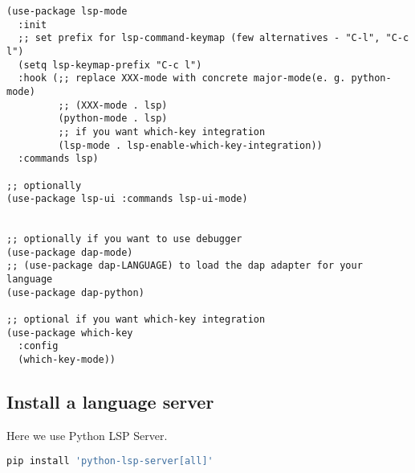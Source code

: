 \begin{lstlisting}[language=elisp]
(use-package lsp-mode
  :init
  ;; set prefix for lsp-command-keymap (few alternatives - "C-l", "C-c l")
  (setq lsp-keymap-prefix "C-c l")
  :hook (;; replace XXX-mode with concrete major-mode(e. g. python-mode)
         ;; (XXX-mode . lsp)               
         (python-mode . lsp)         
         ;; if you want which-key integration
         (lsp-mode . lsp-enable-which-key-integration))
  :commands lsp)

;; optionally
(use-package lsp-ui :commands lsp-ui-mode)


;; optionally if you want to use debugger
(use-package dap-mode)
;; (use-package dap-LANGUAGE) to load the dap adapter for your language
(use-package dap-python)

;; optional if you want which-key integration
(use-package which-key
  :config
  (which-key-mode))
\end{lstlisting}


\subsection{Install a language server}
\label{sec:inst-lang-serv}


Here we use Python LSP Server.

\begin{lstlisting}[language=sh]
pip install 'python-lsp-server[all]'
\end{lstlisting}


